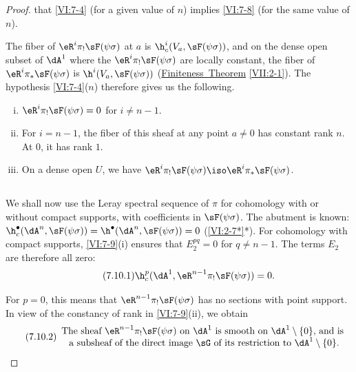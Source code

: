 \begin{proof}[Proof]
that \ref{VI:7-4} (for a given value of $n$) implies \ref{VI:7-8} 
(for the same value of $n$). 

The fiber of $\eR^i \pi_! \sF(\psi\sigma)$ at $a$ is 
$\h_c^i(V_a,\sF(\psi\sigma))$, and on the dense open subset of $\dA^1$ where the 
  $\eR^i \pi_!\sF(\psi\sigma)$ are locally constant, the fiber of 
$\eR^i \pi_\ast \sF(\psi\sigma)$ is $\h^i(V_a,\sF(\psi\sigma))$ 
(\hyperref[VII]{Finiteness\ Theorem} \ref{VII:2-1}). The hypothesis \ref{VI:7-4}($n$) 
therefore gives us the following. 





\begin{lemma_}\label{VI:7-9}
\begin{enumerate}[(i)]
  \item $\eR^i \pi_! \sF(\psi\sigma)=0$ for $i\ne n-1$. 
  \item For $i=n-1$, the fiber of this sheaf at any point $a\ne 0$ has 
    constant rank $n$. At $0$, it has rank $1$. 
  \item On a dense open $U$, we have 
    $\eR^i \pi_! \sF(\psi\sigma) \iso \eR^i \pi_\ast \sF(\psi\sigma)$. 
\end{enumerate}
\end{lemma_}





\subsection{}\label{VI:7-10}

We shall now use the Leray spectral sequence of $\pi$ for 
cohomology with or without compact supports, with coefficients in $\sF(\psi\sigma)$. 
The abutment is known: 
$\h_c^\bullet(\dA^n,\sF(\psi\sigma))=\h^\bullet(\dA^n,\sF(\psi\sigma)) = 0$ 
(\ref{VI:2-7*}*). For cohomology with compact supports, \ref{VI:7-9}(i) ensures that 
$E_2^{pq}=0$ for $q\ne n-1$. The terms $E_2$ are therefore all zero: 
\begin{equation*}\tag{7.10.1}\label{VI:eq:7-10-1}
  \h_c^p(\dA^1,\eR^{n-1} \pi_!\sF(\psi\sigma)) = 0 \text{.} 
\end{equation*}

  For $p=0$, this means that $\eR^{n-1}\pi_! \sF(\psi\sigma)$ has no sections 
with point support. In view of the constancy of rank in \ref{VI:7-9}(ii), we obtain 
\begin{equation*}\tag{7.10.2}\label{VI:eq:7-10-2}
  \begin{array}{c}
    \text{The sheaf $\eR^{n-1} \pi_! \sF(\psi\sigma)$ on $\dA^1$ is smooth on $\dA^1\setminus \{0\}$, and is } \\ 
    \text{a subsheaf of the direct image $\sG$ of its restriction to $\dA^1\setminus \{0\}$.}
  \end{array}
\end{equation*}


\end{proof}
